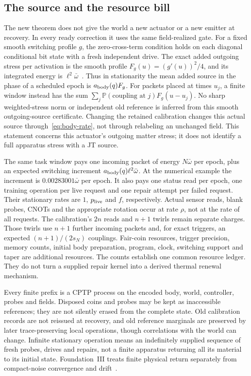 \documentclass[11pt,a4paper]{article}
\newcommand{\Prb}{\mathbb P}
\begin{document}
\subsection{The source and the resource bill}

The new theorem does not give the world a new actuator or a new
emitter at recovery. In every ready correction it uses the same
field-realized gate. For a fixed smooth switching profile $g$,
the zero-cross-term condition holds on each diagonal conditional
bit state with a fresh independent drive. The exact added outgoing
stress per activation is the smooth profile
$F_g(u)=(g'(u))^2/4$, and its integrated energy is
$\ell^2\bar\omega$~\cite{QRAIFB}. Thus in stationarity the mean added
source in the phase of a scheduled epoch is
$a_{\rm body}(q)F_g$. For packets placed at times $u_j$, a finite
window instead has the sum
$\sum_j\Prb(\text{coupling at }j)F_g(u-u_j)$.
No sharp weighted-stress norm or independent old reference is
inferred from this smooth outgoing-source certificate.
Changing the retained calibration changes this actual source
through~\eqref{eq:body-rate}, not through relabeling an unchanged
field. This statement concerns this actuator's outgoing matter
stress; it does not identify a full apparatus stress with a JT source.

The same task window pays one incoming packet of energy
$N\bar\omega$ per epoch, plus an expected switching increment
$a_{\rm body}(q)\ell^2\bar\omega$. At the numerical example the
increment is $0.00283001\bar\omega$ per epoch. It also pays one status
read per epoch, one training operation per live request and one
repair attempt per failed request. Their stationary rates are
$1$, $p_{\rm live}$ and $f$, respectively. Actual sensor reads,
blank probes, CNOTs and the appropriate rotation occur at rate
$\rho$, not at the rate of all requests. The calibration's $2n$
reads and $n+1$ twirls remain separate charges. Those twirls use
$n+1$ further incoming packets and, for exact triggers, an expected
$(n+1)/(2s_N)$ couplings. Fair-coin resources, trigger precision,
memory counts, initial body preparation, program, clock, switching
support and taper are additional resources. The counts establish one common resource
ledger. They do not turn a supplied repair kernel into a derived
thermal renewal mechanism.

Every finite prefix is a CPTP process on the encoded body,
world, controller, probes and fields. Disposed coins and probes may
be kept as inaccessible references; they are not silently erased
from the complete state. Old calibration records are not reissued
at recovery, and old reference marginals are preserved by later
trace-preserving local operations, though correlations with the
world can change. Infinite stationary operation means an indefinitely
supplied sequence of fresh probes, drives and repairs, not a finite
apparatus returning all its material to its initial state.
Foundation~III treats finite physical return separately from
compact-noise convergence and drift~\cite{FoundationIII}.
\end{document}
